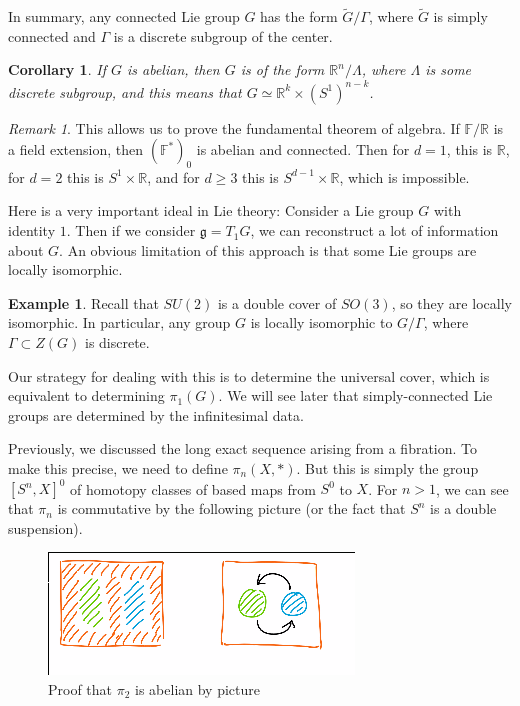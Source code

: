 \documentclass[leqno, openany]{memoir}
\newtheorem{cor}[thm]{Corollary}
\theoremstyle{definition}
\newtheorem{exm}[thm]{Example}
\theoremstyle{remark}
\newtheorem{rmk}[thm]{Remark}
\theoremstyle{plain}
\theoremstyle{definition}
\theoremstyle{remark}
\newcommand{\F}{\mathbb{F}}
\newcommand{\R}{\mathbb{R}}
\newcommand{\mf}[1]{\mathfrak{#1}}
\newcommand{\wtl}[1]{\widetilde{#1}}
\begin{document}
In summary, any connected Lie group $G$ has the form $\wtl{G} / \Gamma$, where $\wtl{G}$ is simply connected and $\Gamma$ is a discrete subgroup of the center.

\begin{cor}
    If $G$ is abelian, then $G$ is of the form $\R^n / \Lambda$, where $\Lambda$ is some discrete subgroup, and this means that $G \simeq \R^k \times (S^1)^{n-k}$.
\end{cor}

\begin{rmk}
    This allows us to prove the fundamental theorem of algebra. If $\F/\R$ is a field extension, then $( \F^* )_0$ is abelian and connected. Then for $d = 1$, this is $\R$, for $d = 2$ this is $S^1 \times \R$, and for $d \geq 3$ this is $S^{d-1} \times \R$, which is impossible.
\end{rmk}


Here is a very important ideal in Lie theory: Consider a Lie group $G$ with identity $1$. Then if we consider $\mf{g} = T_1 G$, we can reconstruct a lot of information about $G$. An obvious limitation of this approach is that some Lie groups are locally isomorphic.

\begin{exm}
    Recall that $SU(2)$ is a double cover of $SO(3)$, so they are locally isomorphic. In particular, any group $G$ is locally isomorphic to $G / \Gamma$, where $\Gamma \subset Z(G)$ is discrete.
\end{exm}

Our strategy for dealing with this is to determine the universal cover, which is equivalent to determining $\pi_1(G)$. We will see later that simply-connected Lie groups are determined by the infinitesimal data.

Previously, we discussed the long exact sequence arising from a fibration. To make this precise, we need to define $\pi_n(X,*)$. But this is simply the group $[S^n, X]^0$ of homotopy classes of based maps from $S^0$ to $X$. For $n > 1$, we can see that $\pi_n$ is commutative by the following picture (or the fact that $S^n$ is a double suspension).
\begin{figure}[H]
    \centering
    \includegraphics[width=0.8\linewidth]{pinab}
    \caption{Proof that $\pi_2$ is abelian by picture}%
    \label{fig:pinab}
\end{figure}
\end{document}
